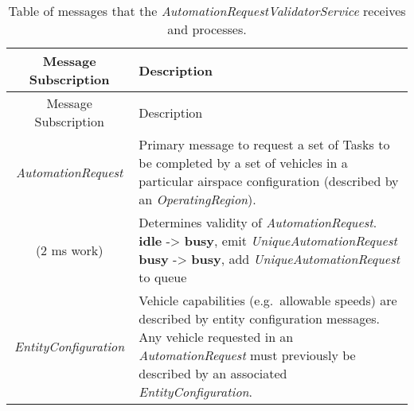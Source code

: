 \begin{longtable}[]{@{}cl@{}}
\caption{Table of messages that the
\emph{AutomationRequestValidatorService} receives and
processes.}\tabularnewline
\toprule
\begin{minipage}[b]{0.4\columnwidth}\centering\strut
Message Subscription\strut
\end{minipage} & \begin{minipage}[b]{0.55\columnwidth}\raggedright\strut
Description\strut
\end{minipage}\tabularnewline
\midrule
\endfirsthead
\toprule
\begin{minipage}[b]{0.4\columnwidth}\centering\strut
Message Subscription\strut
\end{minipage} & \begin{minipage}[b]{0.55\columnwidth}\raggedright\strut
Description\strut
\end{minipage}\tabularnewline
\midrule
\endhead
\begin{minipage}[t]{0.4\columnwidth}\centering\strut
\emph{AutomationRequest}\strut
\end{minipage} & \begin{minipage}[t]{0.55\columnwidth}\raggedright\strut
Primary message to request a set of Tasks to be completed by a set of
vehicles in a particular airspace configuration (described by an
\emph{OperatingRegion}).\strut
\end{minipage}\tabularnewline
\begin{minipage}[t]{0.4\columnwidth}\centering\strut
(2 ms work)\strut
\end{minipage} & \begin{minipage}[t]{0.55\columnwidth}\raggedright\strut
Determines validity of \emph{AutomationRequest}. \textbf{idle}
-\textgreater{} \textbf{busy}, emit \emph{UniqueAutomationRequest}
\textbf{busy} -\textgreater{} \textbf{busy}, add
\emph{UniqueAutomationRequest} to queue\strut
\end{minipage}\tabularnewline
\begin{minipage}[t]{0.4\columnwidth}\centering\strut
\emph{EntityConfiguration}\strut
\end{minipage} & \begin{minipage}[t]{0.55\columnwidth}\raggedright\strut
Vehicle capabilities (e.g.~allowable speeds) are described by entity
configuration messages. Any vehicle requested in an
\emph{AutomationRequest} must previously be described by an associated
\emph{EntityConfiguration}.\strut
\end{minipage}\tabularnewline

\end{longtable}
